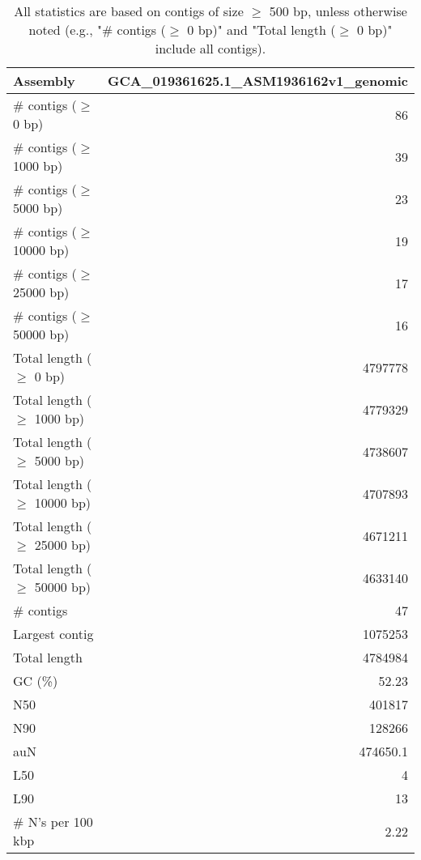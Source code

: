 \documentclass[12pt,a4paper]{article}
\begin{document}
\begin{table}[ht]
\begin{center}
\caption{All statistics are based on contigs of size $\geq$ 500 bp, unless otherwise noted (e.g., "\# contigs ($\geq$ 0 bp)" and "Total length ($\geq$ 0 bp)" include all contigs).}
\begin{tabular}{|l*{1}{|r}|}
\hline
Assembly & GCA\_019361625.1\_ASM1936162v1\_genomic \\ \hline
\# contigs ($\geq$ 0 bp) & 86 \\ \hline
\# contigs ($\geq$ 1000 bp) & 39 \\ \hline
\# contigs ($\geq$ 5000 bp) & 23 \\ \hline
\# contigs ($\geq$ 10000 bp) & 19 \\ \hline
\# contigs ($\geq$ 25000 bp) & 17 \\ \hline
\# contigs ($\geq$ 50000 bp) & 16 \\ \hline
Total length ($\geq$ 0 bp) & 4797778 \\ \hline
Total length ($\geq$ 1000 bp) & 4779329 \\ \hline
Total length ($\geq$ 5000 bp) & 4738607 \\ \hline
Total length ($\geq$ 10000 bp) & 4707893 \\ \hline
Total length ($\geq$ 25000 bp) & 4671211 \\ \hline
Total length ($\geq$ 50000 bp) & 4633140 \\ \hline
\# contigs & 47 \\ \hline
Largest contig & 1075253 \\ \hline
Total length & 4784984 \\ \hline
GC (\%) & 52.23 \\ \hline
N50 & 401817 \\ \hline
N90 & 128266 \\ \hline
auN & 474650.1 \\ \hline
L50 & 4 \\ \hline
L90 & 13 \\ \hline
\# N's per 100 kbp & 2.22 \\ \hline
\end{tabular}
\end{center}
\end{table}
\end{document}
